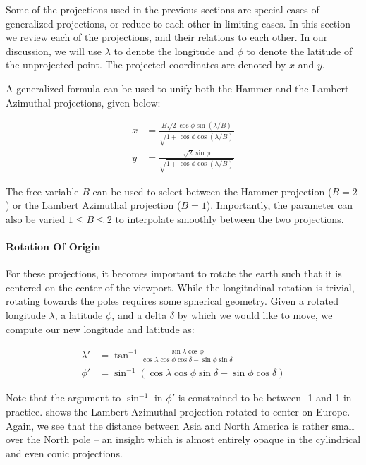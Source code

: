 Some of the projections used in the previous sections are special cases of
  generalized projections, or reduce to each other in limiting cases.
In this section we review each of the projections, and their relations to
  each other.
In our discussion, we will use $\lambda$ to denote the longitude and $\phi$
  to denote the latitude of the unprojected point.
The projected coordinates are denoted by $x$ and $y$.

A generalized formula can be used to unify both the Hammer and the Lambert
  Azimuthal projections, given below:

\def\nu{ \sqrt{1 + \cos \phi \cos (\lambda / B)} }
\begin{align}
x &= \frac{ B \sqrt{2} \cos \phi \sin (\lambda / B) } { \nu } \\
y &= \frac{ \sqrt{2} \sin \phi }{ \nu }
\end{align}

The free variable $B$ can be used to select between the Hammer projection
  ($B = 2$) or the Lambert Azimuthal projection ($B = 1$).
Importantly, the parameter can also be varied $1 \leq B \leq 2$ to interpolate
  smoothly between the two projections.

\paragraph{Rotation Of Origin}
For these projections, it becomes important to rotate the earth such that it is
  centered on the center of the viewport.
While the longitudinal rotation is trivial, rotating towards the poles requires
  some spherical geometry.
Given a rotated longitude $\lambda$, a latitude $\phi$, and a delta $\delta$ by
  which we would like to move, we compute our new longitude and latitude as:

\def\cosdelta{ \cos \delta }
\def\sindelta{ \sin \delta }
\def\clat{ \cos \phi }
\def\x{ \cos \lambda \clat }
\def\y{ \sin \lambda \clat }
\def\z{ \sin \phi }
\def\k{ \x \sindelta + \z \cosdelta }
\begin{align}
\lambda' &= \tan^{-1} \frac{\y}{ \x \cosdelta - \z \sindelta } \\
\phi' &= \sin^{-1} (\k)
\end{align}

Note that the argument to $\sin^{-1}$ in $\phi'$ is constrained to be between
  -1 and 1 in practice.
 shows the Lambert Azimuthal projection rotated to center on
  Europe.
Again, we see that the distance between Asia and North America is rather small
  over the North pole -- an insight which is almost entirely opaque in the
  cylindrical and even conic projections.

